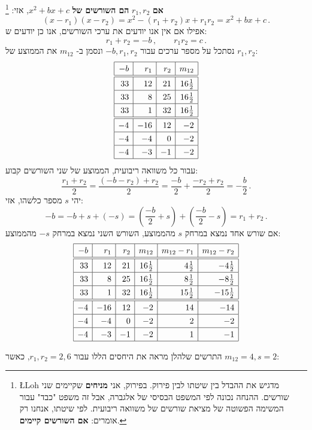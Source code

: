 \textbf{אם}
$r_1,r_2$
\textbf{הם השורשים של}
$x^2+bx+c$,
אזי:%
\footnote{%
\L{Loh}
מדגיש את ההבדל בין שיטתו לבין פירוק. בפירוק, אני 
\textbf{מניחים}
שקיימים שני שורשים. ההנחה נכונה לפי המשפט הבסיסי של אלגברה, אבל זה משפט "כבד" עבור המשימה הפשוטה של מציאת שורשים של משוואה ריבועית. לפי שיטתו, אנחנו רק אומרים:
\textbf{אם השורשים קיימים}.%
}
\[
(x-r_1)(x-r_2)=x^2 - (r_1+r_2)x + r_1r_2=x^2+bx+c\,.
\]
אפילו אם אין אנו יודעים את ערכי השורשים, אנו כן יודעים ש:
\[
r_1+r_2 = -b\,,\quad\quad r_1r_2=c\,.
\]
נסתכל על מספר ערכים עבור
$-b,r_1,r_2$
ונסמן ב-%
$m_{12}$
את הממוצע של
$r_1,r_2$:
\[
\renewcommand{\arraystretch}{1.3}
\begin{array}{|r|r|r|r|}
\hline
-b& r_1 & r_2 &m_{12}\\\hline
\hline
33 & 12 & 21 & 16\frac{1}{2}\\\hline
33 & 8 & 25 & 16\frac{1}{2}\\\hline
33 & 1 & 32 & 16\frac{1}{2}\\\hline
\hline
-4 & -16 & 12 & -2 \\\hline
-4 & -4 & 0 & -2 \\\hline
-4 & -3 & -1 & -2 \\\hline
\end{array}
\]
עבור כל משוואה ריבועית, הממוצע של שני השורשים קבוע:
\[
\frac{r_1+r_2}{2}=
\frac{(-b-r_2)+r_2}{2}=
\frac{-b}{2}+\frac{-r_2+r_2}{2}=
-\frac{b}{2}\,.
\]
יהי 
$s$ 
מספר כלשהו, אזי:
\[
-b=-b+s+(-s)=\left(\frac{-b}{2}+s\right) + \left(\frac{-b}{2}-s\right)=r_1+r_2\,.
\]
אם שורש אחד נמצא במרחק
$s$
מהממוצע, השורש השני נמצא במרחק
$-s$
מהממוצע:
\[
\renewcommand{\arraystretch}{1.3}
\begin{array}{|r|r|r|r|r|r|}
\hline
-b& r_1 & r_2 & m_{12}& m_{12}-r_1 & m_{12}-r_2\\\hline\hline
33 & 12 & 21 & 16\frac{1}{2}&4\frac{1}{2} & -4\frac{1}{2}  \\\hline
33 & 8 & 25 & 16\frac{1}{2}&8\frac{1}{2}&-8\frac{1}{2}\\\hline
33 & 1 & 32 & 16\frac{1}{2}&15\frac{1}{2}&-15\frac{1}{2}\\\hline
\hline
-4 & -16 & 12 & -2 &14& -14\\\hline
-4 & -4 & 0 & -2&2&-2 \\\hline
-4 & -3 & -1 & -2&1&-1 \\\hline
\end{array}
\]

\bigskip

התרשים שלהלן מראה את היחסים הללו עבור
$r_1,r_2=2,6$,
כאשר
$m_{12}=4, s=2$:

